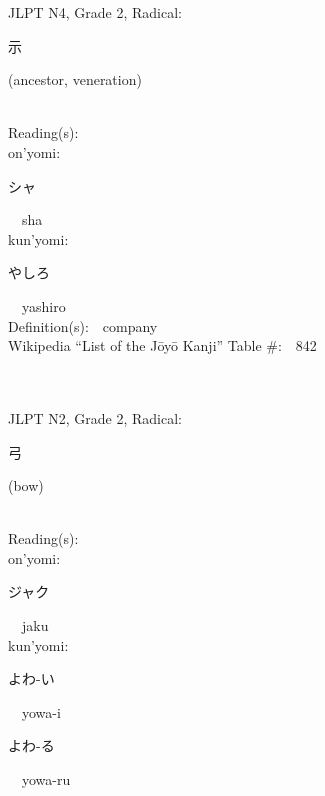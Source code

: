 \begin{multicols}{2}
{JLPT N4, Grade 2, Radical:\ \ {\begin{CJK}{UTF8}{min} 示 \end{CJK}} (ancestor, veneration) } \\
Reading(s):\ \ \\
{\hspace*{1em}}on'yomi:\ \ \\
{\hspace*{2em}}{\begin{CJK}{UTF8}{min} シャ \end{CJK}}\ \ sha\ \ \\
{\hspace*{1em}}kun'yomi:\ \ \\
{\hspace*{2em}}{\begin{CJK}{UTF8}{min} やしろ \end{CJK}}\ \ yashiro\ \ \\
Definition(s):\ \ company \\
Wikipedia ``List of the J\=oy\=o Kanji'' Table \#:\ \ 842 \\
\ \ \\
{\fontsize{34pt}{40pt}  }\ \ \\  %
{JLPT N2, Grade 2, Radical:\ \ {\begin{CJK}{UTF8}{min} 弓 \end{CJK}} (bow) } \\
Reading(s):\ \ \\
{\hspace*{1em}}on'yomi:\ \ \\
{\hspace*{2em}}{\begin{CJK}{UTF8}{min} ジャク \end{CJK}}\ \ jaku\ \ \\
{\hspace*{1em}}kun'yomi:\ \ \\
{\hspace*{2em}}{\begin{CJK}{UTF8}{min} よわ-い \end{CJK}}\ \ yowa-i\ \ \\
{\hspace*{2em}}{\begin{CJK}{UTF8}{min} よわ-る \end{CJK}}\ \ yowa-ru\ \ \\

\end{multicols}
